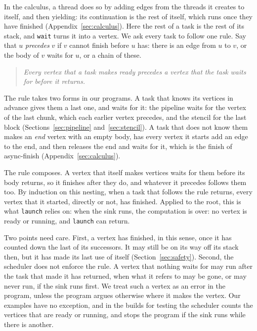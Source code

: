 \documentclass[sigplan,nonacm]{acmart}
\begin{document}
In the calculus, a thread does so by adding edges from the threads it
creates to itself, and then yielding: its continuation is the rest of
itself, which runs once they have finished
(Appendix~\ref{sec:calculus}).
%
Here the rest of a task is the rest of its stack, and
\lstinline|wait| turns it into a vertex.
%
We ask every task to follow one rule.
%
Say that $u$ \emph{precedes} $v$ if $v$ cannot finish before $u$ has:
there is an edge from $u$ to $v$, or the body of $v$ waits for $u$, or
a chain of these.
%
\begin{quote}
\emph{Every vertex that a task makes ready precedes a vertex that the
task waits for before it returns.}
\end{quote}
%
The rule takes two forms in our programs.
%
A task that knows its vertices in advance gives them a last one, and
waits for it: the pipeline waits for the vertex of the last chunk,
which each earlier vertex precedes, and the stencil for the last
block (Sections~\ref{sec:pipeline} and~\ref{sec:stencil}).
%
A task that does not know them makes an \emph{end} vertex with an
empty body, has every vertex it starts add an edge to the end, and
then releases the end and waits for it, which is the finish of
async-finish (Appendix~\ref{sec:calculus}).

The rule composes.
%
A vertex that itself makes vertices waits for them before its body
returns, so it finishes after they do, and whatever it precedes
follows them too.
%
By induction on this nesting, when a task that follows the rule
returns, every vertex that it started, directly or not, has
finished.
%
Applied to the root, this is what \lstinline|launch| relies on: when
the sink runs, the computation is over: no vertex is ready or running,
and \lstinline|launch| can return.

Two points need care.
%
First, a vertex has finished, in this sense, once it has counted
down the last of its successors.
%
It may still be on its way off its stack then, but it has made its
last use of itself (Section~\ref{sec:safety}).
%
Second, the scheduler does not enforce the rule.
%
A vertex that nothing waits for may run after the task that made it
has returned, when what it refers to may be gone, or may never run,
if the sink runs first.
%
We treat such a vertex as an error in the program, unless the program
argues otherwise where it makes the vertex.
%
Our examples have no exception, and in the builds for testing the
scheduler counts the vertices that are ready or running, and stops
the program if the sink runs while there is another.
\end{document}
